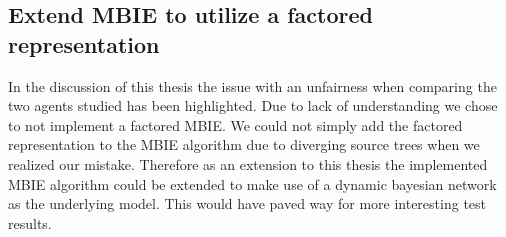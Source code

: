 \subsection{Extend MBIE to utilize a factored representation}
\label{sec:factored_mbie}

In the discussion of this thesis the issue with an unfairness when
comparing the two agents studied has been highlighted. Due to lack of
understanding we chose to not implement a factored MBIE. We could not simply
add the factored representation to the MBIE algorithm due to diverging source
trees when we realized our mistake. Therefore as an extension to this thesis
the implemented MBIE algorithm could be extended to make use of a dynamic
bayesian network as the underlying model. This would have paved way for more
interesting test results.
